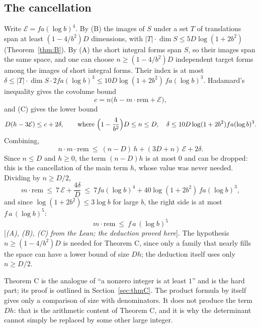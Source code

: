 \documentclass[11pt]{amsart}
\numberwithin{equation}{section}
\theoremstyle{definition}
\theoremstyle{remark}
\newcommand{\status}[1]{\textup{[\emph{#1}]}}
\begin{document}
\subsection*{The cancellation}
Write $\mathcal E=fa(\log b)^4$. By (B) the images of $S$ under a set $T$ of translations span at least $(1-4/b^2)D$ dimensions, with $|T|\cdot\dim S\le5D\log(1+2b^2)$ (Theorem~\ref{thm:B}). By (A) the short integral forms span $S$, so their images span the same space, and one can choose $n\ge(1-4/b^2)D$ independent target forms among the images of short integral forms. Their index is at most $\delta\le|T|\cdot\dim S\cdot2fa(\log b)^3\le10D\log(1+2b^2)\,fa(\log b)^3$. Hadamard's inequality gives the covolume bound
\begin{equation}
 c=n\bigl(h-m\cdot\mathrm{rem}+\mathcal E\bigr),
\end{equation}
and (C) gives the lower bound
\begin{equation}
 D(h-3\mathcal E)\le c+2\delta,\qquad\text{where }\Bigl(1-\frac4{b^2}\Bigr)D\le n\le D,\quad \delta\le10D\log(1+2b^2)fa(\log b)^3.
\end{equation}
Combining,
\begin{equation}
 n\cdot m\cdot\mathrm{rem}\ \le\ (n-D)\,h+(3D+n)\,\mathcal E+2\delta .
\end{equation}
Since $n\le D$ and $h\ge0$, the term $(n-D)h$ is at most $0$ and can be dropped: this is the cancellation of the main term $h$, whose value was never needed. Dividing by $n\ge D/2$,
\begin{equation}
 m\cdot\mathrm{rem}\ \le\ 7\,\mathcal E+\frac{4\delta}D\ \le\ 7fa(\log b)^4+40\log(1+2b^2)\,fa(\log b)^3,
\end{equation}
and since $\log(1+2b^2)\le3\log b$ for large $b$, the right side is at most $f\,a\,(\log b)^5$:
\begin{equation}\tag{M}
 m\cdot\mathrm{rem}\ \le\ f\,a\,(\log b)^5
\end{equation}
\status{(A), (B), (C) from the Lean; the deduction proved here}. The hypothesis $n\ge(1-4/b^2)D$ is needed for Theorem C, since only a family that nearly fills the space can have a lower bound of size $Dh$; the deduction itself uses only $n\ge D/2$.

Theorem C is the analogue of ``a nonzero integer is at least $1$'' and is the hard part; its proof is outlined in Section~\ref{sec:thmC}. The product formula by itself gives only a comparison of size with denominators. It does not produce the term $Dh$: that is the arithmetic content of Theorem C, and it is why the determinant cannot simply be replaced by some other large integer.
\end{document}
